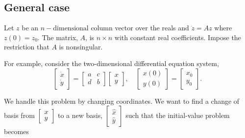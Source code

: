 \documentclass{book}
\begin{document}
\subsection{General case} %
\label{sub:general_case}

Let $z$ be an $n-\text{dimensional}$ column vector over the reals and $\dot{z}=Az$ where $z(0) = z_{0}$. The matrix, $A$, is $n\times n$ with constant real coefficients. Impose the restriction that $A$ is nonsingular.

For example, consider the two-dimensional differential equation system,
\begin{equation*}
\begin{bmatrix}
\dot{x}\\
\dot{y}
\end{bmatrix}
= \begin{bmatrix}
a & c\\
d & b
\end{bmatrix}
\begin{bmatrix}
x\\
y
\end{bmatrix},
\quad
\begin{bmatrix}
x(0)\\
y(0)
\end{bmatrix}
= \begin{bmatrix}
x_{0}\\
y_{0}
\end{bmatrix}.
\end{equation*}

We handle this problem by changing coordinates. We want to find a change of basis from
$\begin{bmatrix}
x\\y
\end{bmatrix}$
to a new basis,
$\begin{bmatrix}
\hat{x}\\
\hat{y}
\end{bmatrix}$
such that the initial-value problem becomes
\end{document}
